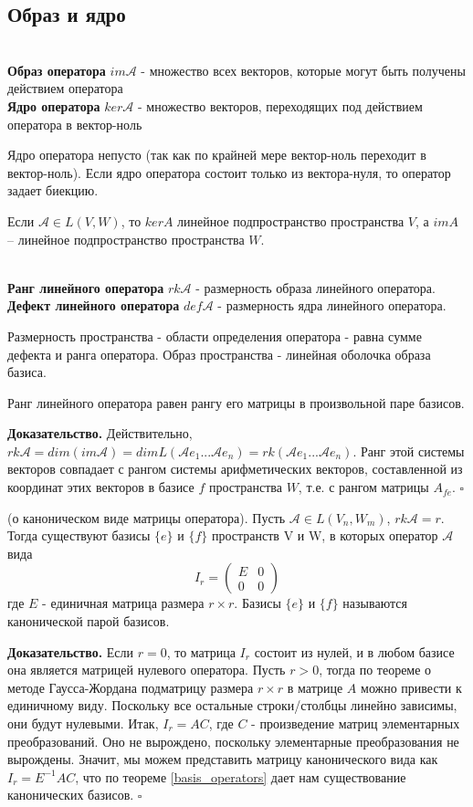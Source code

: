 \subsection{Образ и ядро}
\begin{defin}\makebox{}\\
\textbf{Образ оператора} $im\mathcal A$ - множество всех векторов, которые
могут быть получены действием оператора\\
\textbf{Ядро оператора} $ker\mathcal A$ - множество векторов, переходящих под 
действием оператора в вектор-ноль
\end{defin}
Ядро оператора непусто (так как по крайней мере вектор-ноль переходит в 
вектор-ноль). Если ядро оператора состоит только из вектора-нуля, то оператор
задает биекцию. 

Если $\mathcal A\in L(V,W)$, то $kerA$ линейное подпространство пространства
$V$, а $imA$ – линейное подпространство пространства $W$.

\begin{defin}\makebox{}\\
\textbf{Ранг линейного оператора} $rk \mathcal A$ - размерность образа 
линейного оператора.\\
\textbf{Дефект линейного оператора} $def\mathcal A$ - размерность ядра 
линейного оператора.
\end{defin}
Размерность пространства - области определения оператора - равна сумме 
дефекта и ранга оператора. Образ пространства - линейная оболочка образа базиса. 
\begin{theor}
Ранг линейного оператора равен рангу его матрицы в произвольной паре базисов.
\end{theor}
\textbf{Доказательство.} Действительно, $rk\mathcal A=dim(im\mathcal A)=
dimL(\mathcal Ae_1...\mathcal Ae_n)=rk(\mathcal Ae_1...\mathcal Ae_n)$. 
Ранг этой
системы векторов совпадает с рангом системы арифметических векторов, 
составленной из координат
этих векторов в базисе $f$ пространства $W$, т.е. с рангом матрицы $A_{fe}$.
$\square$
\begin{theor} (о каноническом виде матрицы оператора).
Пусть $\mathcal A\in L(V_n,W_m)$, $rk\mathcal A=r$. Тогда существуют базисы
$\{e\}$ и $\{f\}$ пространств V и W, в которых оператор $\mathcal A$
вида $$I_r=\begin{pmatrix}\boxed{E}&0\\0&0\end{pmatrix}$$
где $E$ - единичная матрица размера $r\times r$. Базисы $\{e\}$ и $\{f\}$ 
называются канонической парой базисов.
\end{theor}
\textbf{Доказательство.} Если $r=0$, то матрица $I_r$ состоит из нулей, и в
любом базисе она является матрицей нулевого оператора. Пусть $r>0$, тогда по
теореме о методе Гаусса-Жордана подматрицу размера $r\times r$ в матрице $A$ 
можно привести к единичному виду. Поскольку все остальные строки/столбцы 
линейно зависимы, они будут нулевыми. Итак, $I_r=AC$, где $C$ - произведение 
матриц элементарных преобразований. Оно не вырождено, поскольку элементарные
преобразования не вырождены. Значит, мы можем представить матрицу канонического
вида как $I_r=E^{-1}AC$, что по теореме \ref{basis_operators} дает нам 
существование канонических базисов. $\square$


